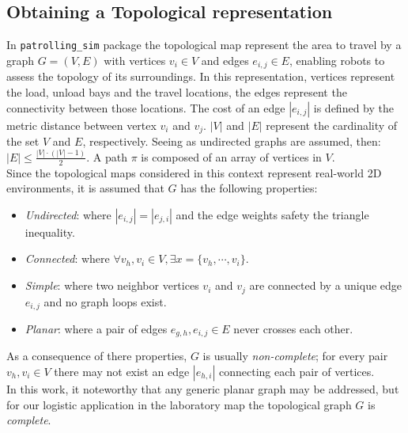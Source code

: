 \subsection{Obtaining a Topological representation}
In \texttt{patrolling\_sim} package the topological map represent the area to travel 
by a graph $G = (V,E)$ with vertices $v_i \in V$ and edges $e_{i,j} \in E$, enabling 
robots to assess the topology of its surroundings. In this representation, vertices
represent the load, unload bays and the travel locations, the edges represent
the connectivity between those locations. The cost of an edge $|e_{i,j}|$ is defined  
by the metric distance between vertex $v_i$ and $v_j$. $|V|$ and $|E|$ represent 
the cardinality of the set $V$ and $E$, respectively. Seeing as undirected graphs are
assumed, then: $|E| \le \frac{|V| \cdot (|V| -1)}{2}$. A path $\pi$ is composed 
of an array of vertices in $V$.
\\
Since the topological maps considered in this context represent real-world 2D environments,
it is assumed that $G$ has the following properties:
\begin{itemize}
    \item \textit{Undirected}: where $|e_{i,j}| = |e_{j,i}|$ and the edge weights safety the triangle inequality.
    \item \textit{Connected}: where $\forall v_h,v_i \in V, \exists x = \{v_{h}, \cdots , v_{i}\}$.
    \item \textit{Simple}: where two neighbor vertices $v_{i}$ and $v_{j}$ are connected 
            by a unique edge $e_{i,j}$ and no graph loops exist.
    \item \textit{Planar}: where a pair of edges $e_{g,h}, e_{i,j} \in E$ never crosses each other. 
\end{itemize}
As a consequence of there properties, $G$ is usually \textit{non-complete}; for 
every pair $v_h, v_i \in V$ there may not exist an edge $|e_{h,i}|$ connecting 
each pair of vertices.
\\
In this work, it noteworthy that any generic planar graph may be addressed, but for 
our logistic application in the laboratory map the topological graph $G$ is \textit{complete}.

